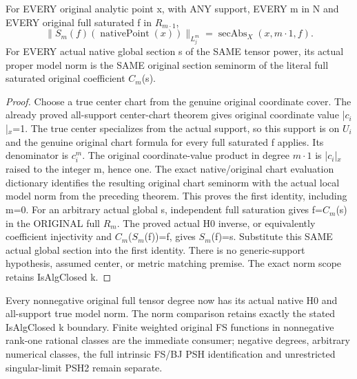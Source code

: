 \begin{theorem}
\label{thm:seven-native-full-tensor-model-norm-dictionary}
\leanok
For EVERY original analytic point x, with ANY support, EVERY m in N and
EVERY original full saturated f in $R_{m\cdot1}$,
\[
 \|S_m(f)(\operatorname{nativePoint}(x))\|_{L_j^m}
 =\operatorname{secAbs}_X(x,m\cdot1,f).
\]
For EVERY actual native global section s of the SAME tensor power, its
actual proper model norm is the SAME original section seminorm of the
literal full saturated original coefficient $C_m$(s).
\end{theorem}
\begin{proof}
Choose a true center chart from the genuine original coordinate cover.
The already proved all-support center-chart theorem gives original
coordinate value |$c_i$|$_x$=1. The true center specializes from the actual
support, so this support is on $U_i$ and the genuine original chart formula
for every full saturated f applies. Its denominator is $c_i^m$. The original
coordinate-value product in degree $m\cdot1$ is |$c_i$|$_x$ raised to the integer
m, hence one. The exact native/original chart evaluation dictionary
identifies the resulting original chart seminorm with the actual local
model norm from the preceding theorem. This proves the first identity,
including m=0. For an arbitrary actual global s, independent full saturation
gives f=$C_m$(s) in the ORIGINAL full $R_m$. The proved actual H0 inverse,
or equivalently coefficient injectivity and $C_m$($S_m$(f))=f, gives
$S_m$(f)=s. Substitute this SAME actual global section into the first identity.
There is no generic-support hypothesis, assumed center, or metric matching
premise. The exact norm scope retains IsAlgClosed k.
\end{proof}


\begin{remark}
Every nonnegative original full tensor degree now has its actual native
H0 and all-support true model norm. The norm comparison retains exactly
the stated IsAlgClosed k boundary. Finite weighted original FS functions
in nonnegative rank-one rational classes are the immediate consumer;
negative degrees, arbitrary numerical classes, the full intrinsic FS/BJ
PSH identification and unrestricted singular-limit PSH2 remain separate.
\end{remark}

